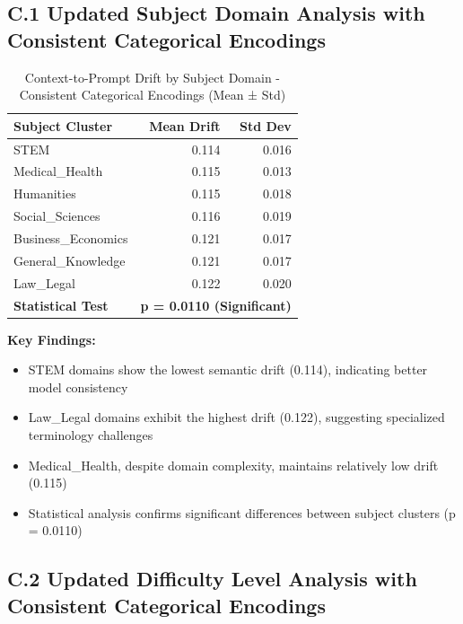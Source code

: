 \documentclass[letterpaper]{article}
\begin{document}
\subsection*{C.1 Updated Subject Domain Analysis with Consistent Categorical Encodings}

\begin{table}[ht]
\centering
\caption{Context-to-Prompt Drift by Subject Domain - Consistent Categorical Encodings (Mean ± Std)}
\label{tab:subject_analysis_detailed}
\begin{tabular}{lrr}
\toprule
\textbf{Subject Cluster} & \textbf{Mean Drift} & \textbf{Std Dev} \\
\midrule
STEM & 0.114 & 0.016 \\
Medical\_Health & 0.115 & 0.013 \\
Humanities & 0.115 & 0.018 \\
Social\_Sciences & 0.116 & 0.019 \\
Business\_Economics & 0.121 & 0.017 \\
General\_Knowledge & 0.121 & 0.017 \\
Law\_Legal & 0.122 & 0.020 \\
\midrule
\textbf{Statistical Test} & \multicolumn{2}{c}{\textbf{p = 0.0110 (Significant)}} \\
\bottomrule
\end{tabular}
\end{table}

\textbf{Key Findings:}
\begin{itemize}
\item STEM domains show the lowest semantic drift (0.114), indicating better model consistency
\item Law\_Legal domains exhibit the highest drift (0.122), suggesting specialized terminology challenges
\item Medical\_Health, despite domain complexity, maintains relatively low drift (0.115)
\item Statistical analysis confirms significant differences between subject clusters (p = 0.0110)
\end{itemize}

\subsection*{C.2 Updated Difficulty Level Analysis with Consistent Categorical Encodings}
\end{document}
